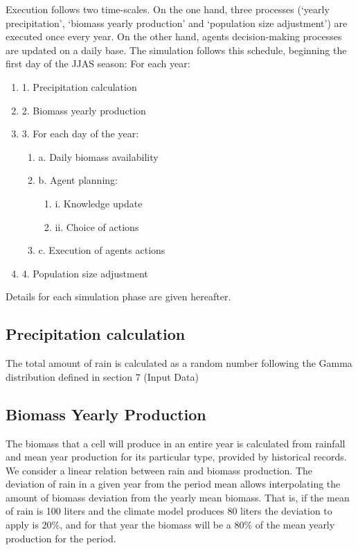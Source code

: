 \documentclass[11pt,oneside,a4paper,openright]{report}
\begin{document}
Execution follows two time-scales. On the one hand, three processes (‘yearly precipitation’, ‘biomass
yearly production’ and ‘population size adjustment’) are executed once every year. On the other hand,
agents decision-making processes are updated on a daily base. The simulation follows this schedule,
beginning the first day of the JJAS season:
For each year:
\begin{enumerate}
	\item 1. Precipitation calculation
	\item 2. Biomass yearly production
	\item 3. For each day of the year:
	\begin{enumerate}
		\item a. Daily biomass availability
		\item b. Agent planning:
		\begin{enumerate}
			\item i. Knowledge update
			\item ii. Choice of actions
		\end{enumerate}
		\item c. Execution of agents actions
	\end{enumerate}
	\item 4. Population size adjustment
\end{enumerate}


Details for each simulation phase are given hereafter.


\subsection{Precipitation calculation}
The total amount of rain is calculated as a random number following the Gamma distribution defined in
section 7 (Input Data)
\subsection{Biomass Yearly Production}
The biomass that a cell will produce in an entire year is calculated from rainfall and mean year
production for its particular type, provided by historical records.
We consider a linear relation between rain and biomass production. The deviation of rain in a given
year from the period mean allows interpolating the amount of biomass deviation from the yearly mean
biomass. That is, if the mean of rain is 100 liters and the climate model produces 80 liters the deviation
to apply is 20\%, and for that year the biomass will be a 80\% of the mean yearly production for the
period.
\end{document}
